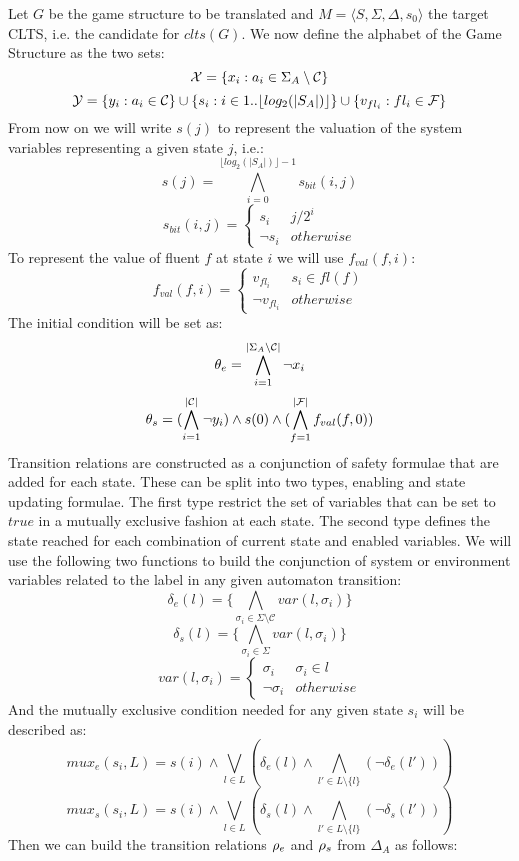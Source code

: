 Let $G$ be the game structure to be translated and $M=\langle S, \Sigma, \Delta, s_0 \rangle$ the target CLTS, i.e. the candidate for $clts(G)$.  We now define the alphabet of the Game Structure as the two sets:
\[{\mathcal{X}} = \{x_i : a_i \in \Sigma_A \setminus \mathcal{C} \}\]
\[{\mathcal{Y}} = \{y_i : a_i \in \mathcal{C} \} \cup \{s_i : i \in 1..\lfloor log_2(|S_A|)\rfloor \} \cup \{v_{fl_i} : fl_i \in \mathcal{F}\}\]
From now on we will write $s(j)$ to represent the valuation of the system variables representing a given state $j$, i.e.: 
\[s(j) = \bigwedge\limits^{\lfloor log_2(|S_A|)\rfloor - 1}_{i=0}  s_{bit}(i,j)\]
\[
s_{bit}(i,j) = \begin{cases}
s_i & j / 2^i \\
\neg s_i & otherwise
\end{cases}
\]
To represent the value of fluent $f$ at state $i$ we will use $f_{val}(f,i)$:
\[
f_{val}(f,i) = \begin{cases}
v_{fl_i} & s_i \in fl(f) \\
\neg v_{fl_i} & otherwise
\end{cases}
\]
The initial condition will be set as:
\[{\theta_e} = \bigwedge_{i = 1}^{|\Sigma_A \setminus \mathcal{C}|}\neg x_i\]
\[{\theta_s} = (\bigwedge_{i = 1}^{|\mathcal{C}|}\neg y_i) \wedge s(0) \wedge (\bigwedge_{f = 1}^{|\mathcal{F}|}f_{val}(f,0))\]
Transition relations are constructed as a conjunction of safety formulae that are added for each state. These can be split into two types, enabling and state updating formulae. The first type restrict the set of variables that can be set to $true$ in a mutually exclusive fashion at each state. The second type defines the state reached for each combination of current state and enabled variables. 
We will use the following two functions to build the conjunction of system or environment variables related to the label in any given automaton transition:
\[\delta_e(l) = \{\bigwedge_{\sigma_i \in \Sigma \setminus \mathcal{C}}var(l, \sigma_i)\}\]
\[\delta_s(l) = \{\bigwedge_{\sigma_i \in \Sigma}var(l, \sigma_i)\}\]
\[
var(l, \sigma_i) = \begin{cases}
\sigma_i & \sigma_i \in l \\
\neg \sigma_i & otherwise
\end{cases}
\]
And the mutually exclusive condition needed for any given state $s_i$ will be described as:
\[mux_e(s_i,L) = s(i) \wedge \bigvee_{l \in L}(\delta_e(l) \wedge \bigwedge_{l' \in L \setminus \{l\}}(\neg \delta_e(l')) ) \]
\[mux_s(s_i,L) = s(i) \wedge \bigvee_{l \in L}(\delta_s(l) \wedge \bigwedge_{l' \in L \setminus \{l\}}(\neg \delta_s(l')) ) \]
Then we can build the transition relations ${\rho_e}$ and ${\rho_s}$ from $\Delta_A$ as follows:


